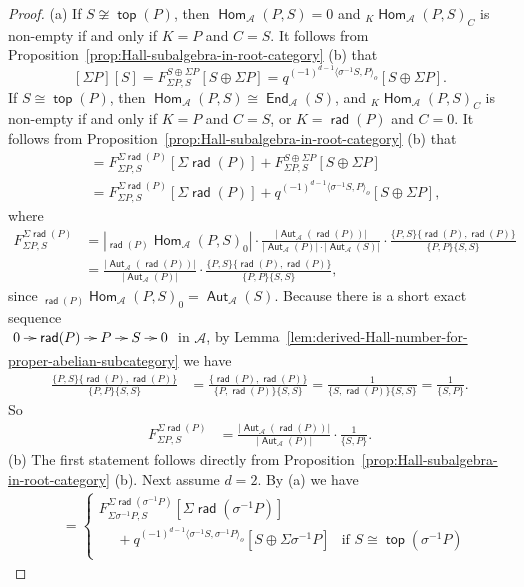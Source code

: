 \documentclass[reqno,12pt,a4paper]{amsart}
\theoremstyle{remark}
\theoremstyle{definition}
\newcommand{\opname}[1]{\operatorname{\mathsf{#1}}}
\newcommand{\rad}{\opname{rad}\nolimits}
\renewcommand{\top}{\opname{top}\nolimits}
\newcommand{\Hom}{\opname{Hom}}
\newcommand{\End}{\opname{End}}
\newcommand{\Aut}{\opname{Aut}}
\newcommand{\ca}{{\mathcal A}}
\numberwithin{equation}{section}
\begin{document}
\begin{proof}
(a)
If $S\not\cong \top(P)$, then $\Hom_\ca(P,S)=0$ and ${}_K\Hom_\ca(P,S)_C$ is non-empty if and only if $K=P$ and $C=S$.
It follows from Proposition~\ref{prop:Hall-subalgebra-in-root-category} (b) that
\[
[\Sigma P][S]=F_{\Sigma P,S}^{S\oplus\Sigma P}[S\oplus \Sigma P]=q^{(-1)^{d-1}\langle\sigma^{-1}S,P\rangle_o}[S\oplus\Sigma P].
\]
If $S\cong \top(P)$, then $\Hom_\ca(P,S)\cong\End_\ca(S)$, and ${}_K\Hom_\ca(P,S)_C$ is non-empty if and only if $K=P$ and $C=S$, or $K=\rad(P)$ and $C=0$. It follows from Proposition~\ref{prop:Hall-subalgebra-in-root-category} (b) that
\begin{align*}
[\Sigma P][S]&=F_{\Sigma P,S}^{\Sigma \rad(P)}[\Sigma \rad(P)]+F_{\Sigma P,S}^{S\oplus\Sigma P}[S\oplus \Sigma P]\\
&=F_{\Sigma P,S}^{\Sigma \rad(P)}[\Sigma \rad(P)]+q^{(-1)^{d-1}\langle\sigma^{-1}S,P\rangle_o}[S\oplus\Sigma P],
\end{align*}
where
\begin{align*}
F_{\Sigma P,S}^{\Sigma \rad(P)}&=|{}_{\rad(P)}\Hom_\ca(P,S)_0|\cdot\frac{|\Aut_\ca(\rad(P))|}{|\Aut_\ca(P)|\cdot |\Aut_\ca(S)|}\cdot \frac{\{P,S\}\{\rad(P),\rad(P)\}}{\{P,P\}\{S,S\}}\\
&=\frac{|\Aut_\ca(\rad(P))|}{|\Aut_\ca(P)|}\cdot \frac{\{P,S\}\{\rad(P),\rad(P)\}}{\{P,P\}\{S,S\}},
\end{align*}
since ${}_{\rad(P)}\Hom_\ca(P,S)_0=\Aut_\ca(S)$.
Because there is a short exact sequence\\ $\xymatrix@C=0.7pc{0\ar[r] &\rad(P)\ar[r] & P\ar[r] & S\ar[r] &0}$ in $\ca$, by Lemma~\ref{lem:derived-Hall-number-for-proper-abelian-subcategory} we have
\begin{align*}
\frac{\{P,S\}\{\rad(P),\rad(P)\}}{\{P,P\}\{S,S\}}&=\frac{\{\rad(P),\rad(P)\}}{\{P,\rad(P)\}\{S,S\}}=\frac{1}{\{S,\rad(P)\}\{S,S\}}=\frac{1}{\{S,P\}}.
\end{align*}
So
\begin{align*}
F_{\Sigma P,S}^{\Sigma\rad(P)}&=\frac{|\Aut_\ca(\rad(P))|}{|\Aut_\ca(P)|}\cdot \frac{1}{\{S,P\}}.
\end{align*}
(b) The first statement follows directly from Proposition~\ref{prop:Hall-subalgebra-in-root-category} (b).
Next assume $d=2$. By (a) we have
\begin{align*}
[\Sigma \sigma^{-1}P][S]&=\begin{cases}
F_{\Sigma \sigma^{-1}P,S}^{\Sigma\rad(\sigma^{-1}P)}[\Sigma\rad(\sigma^{-1}P)]\\ \hspace{15pt}+q^{(-1)^{d-1}\langle \sigma^{-1}S,\sigma^{-1}P\rangle_o}[S\oplus\Sigma \sigma^{-1}P] & \text{if }S\cong\top(\sigma^{-1}P)\\

\end{cases}
\end{align*}
\end{proof}
\end{document}
